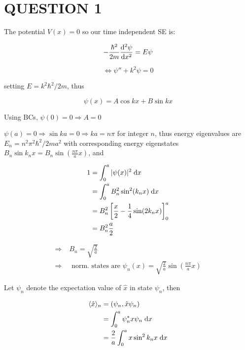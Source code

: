 \documentclass[a4paper]{article}
\begin{document}
	
\maketitle

\section{QUESTION 1}


The potential $ V(x) = 0 $ so our time independent SE is:

\[ -\frac{\hbar^{2}}{2m} \frac{\mathrm{d}^{2} \psi}{\mathrm{d} x^{2}} = E \psi  \]

\[ \iff \psi'' + k^{2} \psi = 0 \]

setting $ E = k^{2} \hbar^{2} / 2m $, thus 

\[ \psi(x) = A \cos k x + B \sin k x \]

Using BCs, $ \psi(0) = 0 \Rightarrow A = 0 $

$ \psi(a) = 0 \Rightarrow \sin k a = 0 \Rightarrow k a =  n \pi  $ for integer $ n $, thus energy eigenvalues are $ E_{n} = n^{2} \pi^{2} \hbar^{2} / 2m a^{2} $ with corresponding energy eigenstates $ B_{n} \sin k_{n} x = B_{n} \sin ( \frac{n \pi}{a} x ) $, and 

\begin{align*}
1 & = \int_{0}^{a} |  \psi(x) |^{2} \; \mathrm{d} x \\
& = \int_{0}^{a} B_{n}^{2} \sin^{2} ( k_{n} x ) \; \mathrm{d} x  \\
& = B_{n}^{2} \left[  \frac{x}{2}  - \frac{1}{4} \sin ( 2 k_{n} x ) \right]_{0}^{a} \\
& = B_{n}^{2} \frac{a}{2}
\end{align*}

\begin{align*}
\Rightarrow \; & B_{n}  = \sqrt{\frac{2}{a}} \\
\Rightarrow & \text{ norm. states are } \psi_{n}(x) = \sqrt{\frac{2}{a}} \sin \left(    \frac{n \pi}{a} x \right) 
\end{align*} 

Let $ \psi_{n} $ denote the expectation value of $ \hat{x} $ in state $ \psi_{n} $, then

\begin{align*}
\langle \hat{x} \rangle_{n} & = (\psi_{n},\hat{x} \psi_{n} )  \\
& = \int_{0}^{a} \psi_{n}^{*} x \psi_{n} \; \mathrm{d} x \\
& = \frac{2}{a} \int_{0}^{a}  x \sin^{2} k_{n} x \; \mathrm{d} x \\
\end{align*}
\end{document}
